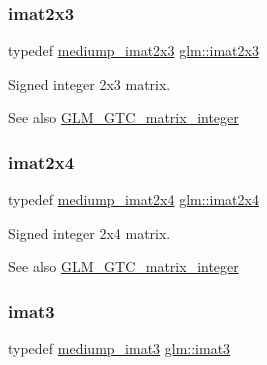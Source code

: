 \subsubsection{\texorpdfstring{imat2x3}{imat2x3}}
{\footnotesize\ttfamily typedef \hyperlink{group__gtc__matrix__integer_ga07314e9f05b82367570ca44c3ef7c0a7}{mediump\+\_\+imat2x3} \hyperlink{group__gtc__matrix__integer_ga143bc5177bac9991d84b70da03952516}{glm\+::imat2x3}}

Signed integer 2x3 matrix. \begin{DoxySeeAlso}{See also}
\hyperlink{group__gtc__matrix__integer}{G\+L\+M\+\_\+\+G\+T\+C\+\_\+matrix\+\_\+integer} 
\end{DoxySeeAlso}
\mbox{\label{group__gtc__matrix__integer_gafe2d058e164fd1badace451ffcf4ae46}} 
\subsubsection{\texorpdfstring{imat2x4}{imat2x4}}
{\footnotesize\ttfamily typedef \hyperlink{group__gtc__matrix__integer_ga944a139f15de6bc12e9c7bf615ffc4f5}{mediump\+\_\+imat2x4} \hyperlink{group__gtc__matrix__integer_gafe2d058e164fd1badace451ffcf4ae46}{glm\+::imat2x4}}

Signed integer 2x4 matrix. \begin{DoxySeeAlso}{See also}
\hyperlink{group__gtc__matrix__integer}{G\+L\+M\+\_\+\+G\+T\+C\+\_\+matrix\+\_\+integer} 
\end{DoxySeeAlso}
\mbox{\label{group__gtc__matrix__integer_ga45481922dd07a3a8e23758286311ee97}} 
\subsubsection{\texorpdfstring{imat3}{imat3}}
{\footnotesize\ttfamily typedef \hyperlink{group__gtc__matrix__integer_gab033bd6a2bfebb1aa35d458c6f077ccb}{mediump\+\_\+imat3} \hyperlink{group__gtc__matrix__integer_ga45481922dd07a3a8e23758286311ee97}{glm\+::imat3}}

